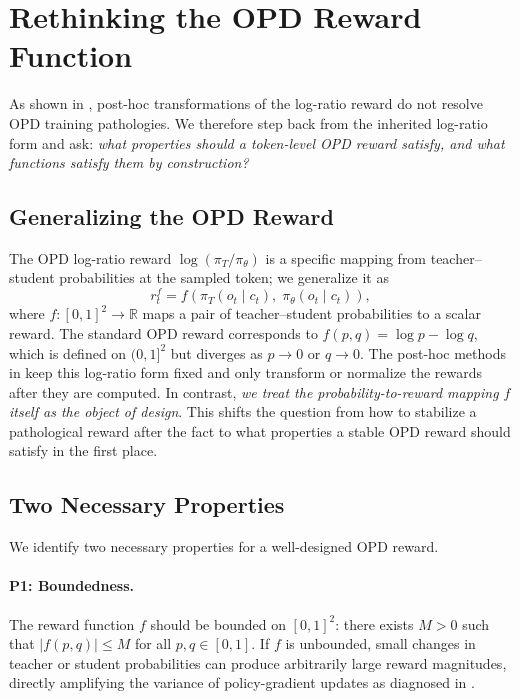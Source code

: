 \section{Rethinking the OPD Reward Function}
\label{sec:method}



As shown in , post-hoc transformations of the log-ratio reward do not resolve OPD training pathologies. We therefore step back from the inherited log-ratio form and ask: \emph{what properties should a token-level OPD reward satisfy, and what functions satisfy them by construction?}

\subsection{Generalizing the OPD Reward}
\label{sec:framework}

The OPD log-ratio reward \(\log(\pi_T/\pi_\theta)\) is a specific mapping from teacher--student probabilities at the sampled token; we generalize it as
\begin{equation}
  r_t^{f} = f\!\left(\pi_T(o_t \mid c_t),\; \pi_\theta(o_t \mid c_t)\right),
\end{equation}
where \(f : [0,1]^2 \to \mathbb{R}\) maps a pair of teacher--student probabilities to a scalar reward. The standard OPD reward corresponds to \(f(p,q)=\log p-\log q\), which is defined on \((0,1]^2\) but diverges as \(p \to 0\) or \(q \to 0\). The post-hoc methods in  keep this log-ratio form fixed and only transform or normalize the rewards after they are computed. In contrast, \emph{we treat the probability-to-reward mapping \(f\) itself as the object of design}. This shifts the question from how to stabilize a pathological reward after the fact to what properties a stable OPD reward should satisfy in the first place.

\subsection{Two Necessary Properties}
\label{sec:properties}

We identify two necessary properties for a well-designed OPD reward.

\paragraph{P1: Boundedness.}
The reward function \(f\) should be bounded on \([0,1]^2\): there exists \(M > 0\) such that \(|f(p, q)| \leq M\) for all \(p, q \in [0,1]\). If \(f\) is unbounded, small changes in teacher or student probabilities can produce arbitrarily large reward magnitudes, directly amplifying the variance of policy-gradient updates as diagnosed in .

